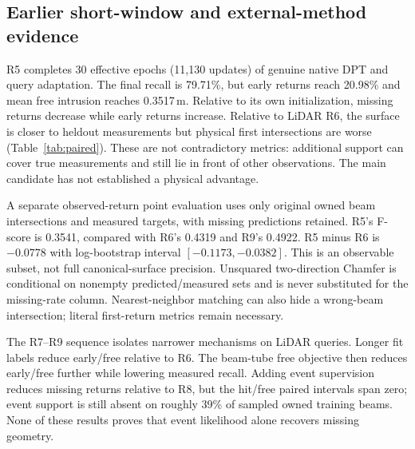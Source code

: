 \documentclass[10pt,a4paper]{article}
\begin{document}
\subsection{Earlier short-window and external-method evidence}
R5 completes 30 effective epochs (11,130 updates) of genuine native DPT and
query adaptation. The final recall is 79.71\%, but early returns reach 20.98\%
and mean free intrusion reaches 0.3517\,m. Relative to its own initialization,
missing returns decrease while early returns increase. Relative to LiDAR R6,
the surface is closer to heldout measurements but physical first intersections
are worse (Table~\ref{tab:paired}). These are not contradictory metrics:
additional support can cover true measurements and still lie in front of other
observations. The main candidate has not established a physical advantage.

\begin{table}[htbp]
\centering\small

\caption{Selected paired development differences, five independent logs.
Positive early/free and negative hit are adverse. R5 versus R6 shares the
short-window label regime, but differs in visual input and native adaptation;
it does not isolate attention. The recovered R5 run also has the random-state
limitation described in Section~\ref{sec:limits}.}
\label{tab:paired}
\end{table}

A separate observed-return point evaluation uses only original owned beam
intersections and measured targets, with missing predictions retained. R5's
F-score is 0.3541, compared with R6's 0.4319 and R9's 0.4922. R5 minus R6 is
$-0.0778$ with log-bootstrap interval $[-0.1173,-0.0382]$. This is an observable
subset, not full canonical-surface precision. Unsquared two-direction Chamfer
is conditional on nonempty predicted/measured sets and is never substituted
for the missing-rate column. Nearest-neighbor matching can also hide a
wrong-beam intersection; literal first-return metrics remain necessary.

The R7--R9 sequence isolates narrower mechanisms on LiDAR queries. Longer fit
labels reduce early/free relative to R6. The beam-tube free objective then
reduces early/free further while lowering measured recall. Adding event
supervision reduces missing returns relative to R8, but the hit/free paired
intervals span zero; event support is still absent on roughly 39\% of sampled
owned training beams. None of these results proves that event likelihood alone
recovers missing geometry.
\end{document}
